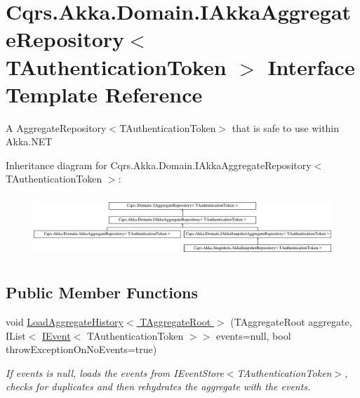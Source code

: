 \hypertarget{interfaceCqrs_1_1Akka_1_1Domain_1_1IAkkaAggregateRepository}{}\section{Cqrs.\+Akka.\+Domain.\+I\+Akka\+Aggregate\+Repository$<$ T\+Authentication\+Token $>$ Interface Template Reference}
\label{interfaceCqrs_1_1Akka_1_1Domain_1_1IAkkaAggregateRepository}


A Aggregate\+Repository$<$\+T\+Authentication\+Token$>$ that is safe to use within Akka.\+N\+ET  


Inheritance diagram for Cqrs.\+Akka.\+Domain.\+I\+Akka\+Aggregate\+Repository$<$ T\+Authentication\+Token $>$\+:\begin{figure}[H]
\begin{center}
\leavevmode
\includegraphics[height=2.357895cm]{interfaceCqrs_1_1Akka_1_1Domain_1_1IAkkaAggregateRepository}
\end{center}
\end{figure}
\subsection*{Public Member Functions}
\begin{DoxyCompactItemize}
\item 
void \hyperlink{interfaceCqrs_1_1Akka_1_1Domain_1_1IAkkaAggregateRepository_a9010b259daf5d09f7269277361015ddf_a9010b259daf5d09f7269277361015ddf}{Load\+Aggregate\+History$<$ T\+Aggregate\+Root $>$} (T\+Aggregate\+Root aggregate, I\+List$<$ \hyperlink{interfaceCqrs_1_1Events_1_1IEvent}{I\+Event}$<$ T\+Authentication\+Token $>$$>$ events=null, bool throw\+Exception\+On\+No\+Events=true)
\begin{DoxyCompactList}\small\item\em If {\itshape events}  is null, loads the events from I\+Event\+Store$<$\+T\+Authentication\+Token$>$, checks for duplicates and then rehydrates the {\itshape aggregate}  with the events. \end{DoxyCompactList}\end{DoxyCompactItemize}


